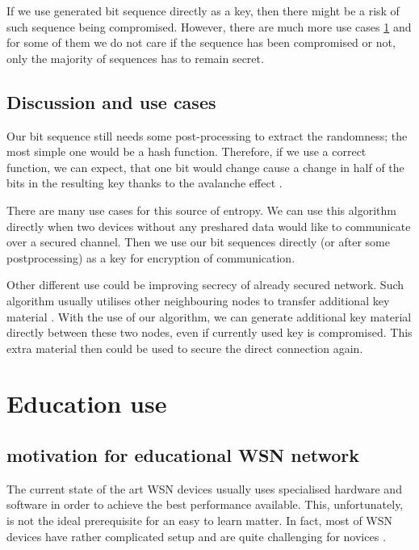\documentclass[
  print, %
  Table,   %
  nolof,     %
  nolot,     %
           oneside
]{fithesis3}
\begin{document}
If we use generated bit sequence directly as a key, then there might be a risk of such sequence being compromised. However, there are much more use cases \ref{sec:use} and for some of them we do not care if the sequence has been compromised or not, only the majority of sequences has to remain secret.

  \section{Discussion and use cases}\label{sec:use}
  Our bit sequence still needs some post-processing to extract the randomness; the most simple one would be a hash function. Therefore, if we use a correct function, we can expect, that one bit would change cause a change in half of the bits in the resulting key thanks to the avalanche effect \cite{Webster1986}.

  There are many use cases for this source of entropy. We can use this algorithm directly when two devices without any preshared data would like to communicate over a secured channel. Then we use our bit sequences directly (or after some postprocessing) as a key for encryption of communication.

  Other different use could be improving secrecy of already secured network. Such algorithm usually utilises other neighbouring nodes to transfer additional key material \cite{2015-wistp-ostadal}. With the use of our algorithm, we can generate additional key material directly between these two nodes, even if currently used key is compromised. This extra material then could be used to secure the direct connection again.


\chapter{Education use}\label{ch:edu}

  \section{motivation for educational WSN network}
  The current state of the art WSN devices usually uses specialised hardware and software in order to achieve the best performance available. %
  This, unfortunately, is not the ideal prerequisite for an easy to learn matter. In fact, most of WSN devices have rather complicated setup and are quite challenging for novices \cite{hu2010wireless}.
\end{document}
